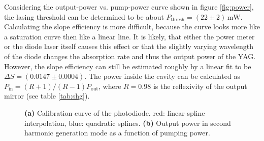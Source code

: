 \documentclass[a4paper]{scrartcl}
\numberwithin{equation}{section}
\numberwithin{figure}{section}
\numberwithin{table}{section}
\begin{document}
Considering the output-power vs. pump-power curve shown in figure \ref{fig:power}, the lasing threshold can be determined to be about $P_\text{thresh}=(22\pm 2)\,\text{mW}$. Calculating the slope efficiency is more difficult, because the curve looks more like a saturation curve then like a linear line. It is likely, that either the power meter or the diode laser itself causes this effect or that the slightly varying wavelength of the diode changes the absorption rate and thus the output power of the YAG. However, the slope efficiency can still be estimated roughly by a linear fit to be $\Delta S = (0.0147\pm 0.0004)$. The power inside the cavity can be calculated as $P_\text{in}=(R+1)/(R-1) P_\text{out}$, where $R=0.98$ is the reflexivity of the output mirror (see table \ref{tab:shg}).


\begin{figure}[p]
\centering
{}
\hfill
{}
\caption{\small \textbf{(a)} Calibration curve of the photodiode. red: linear spline interpolation, blue: quadratic splines. \textbf{(b)} Output power in second harmonic generation mode as a function of pumping power.}
\label{fig:diode}
\end{figure}
\end{document}

